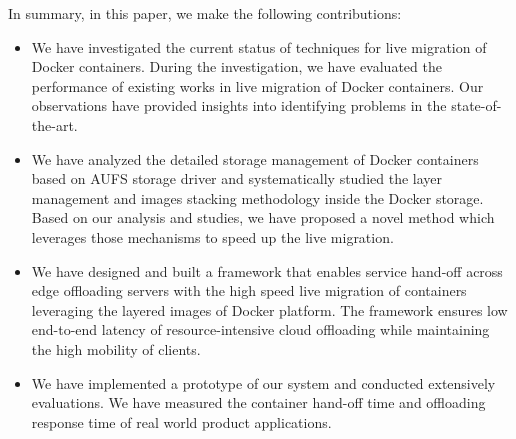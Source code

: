 In summary, in this paper, we make the following contributions:
\begin{itemize}
    
    \item We have investigated the current status of techniques for live migration of Docker containers. 
    During the investigation, we have evaluated the performance of existing works in live migration of Docker containers. 
    Our observations have provided insights into identifying problems in the state-of-the-art.
     
    \item  We have analyzed the detailed storage management of Docker containers based on AUFS storage driver and systematically studied the layer management and images stacking methodology inside the Docker storage. Based on our analysis and studies, we have proposed a novel method which leverages those mechanisms to speed up the live migration.
    
 
     \item We have designed and built a framework that enables service hand-off across edge offloading servers with the high speed live migration of containers leveraging the layered images of Docker platform. The framework ensures low end-to-end latency of resource-intensive cloud offloading while maintaining the high mobility of clients. 
     
    \item We have implemented a prototype of our system and conducted extensively evaluations. We have measured the container hand-off time and offloading response time of real world product applications.
    
\end{itemize}